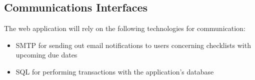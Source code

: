 \documentclass{article}
\begin{document}
\subsection{Communications Interfaces}
The web application will rely on the following technologies for communication:
\begin{itemize}
    \item SMTP for sending out email notifications to users concerning checklists with upcoming due dates
    \item SQL for performing transactions with the application's database
\end{itemize}

\newpage
\end{document}
